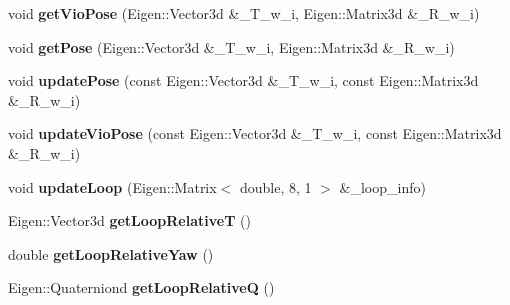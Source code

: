 \begin{DoxyCompactItemize}
\item 
\mbox{\label{classKeyFrame_ac52e119d0490ba6bff36531032bd3840}} 
void {\bfseries get\+Vio\+Pose} (Eigen\+::\+Vector3d \&\+\_\+\+T\+\_\+w\+\_\+i, Eigen\+::\+Matrix3d \&\+\_\+\+R\+\_\+w\+\_\+i)
\item 
\mbox{\label{classKeyFrame_a24f40f8b54c3b1be6b5bde3e8f6b682f}} 
void {\bfseries get\+Pose} (Eigen\+::\+Vector3d \&\+\_\+\+T\+\_\+w\+\_\+i, Eigen\+::\+Matrix3d \&\+\_\+\+R\+\_\+w\+\_\+i)
\item 
\mbox{\label{classKeyFrame_a553565034bc1933f122352a90a552c98}} 
void {\bfseries update\+Pose} (const Eigen\+::\+Vector3d \&\+\_\+\+T\+\_\+w\+\_\+i, const Eigen\+::\+Matrix3d \&\+\_\+\+R\+\_\+w\+\_\+i)
\item 
\mbox{\label{classKeyFrame_a5947ef3d15931e4b9c426f0f2bd28821}} 
void {\bfseries update\+Vio\+Pose} (const Eigen\+::\+Vector3d \&\+\_\+\+T\+\_\+w\+\_\+i, const Eigen\+::\+Matrix3d \&\+\_\+\+R\+\_\+w\+\_\+i)
\item 
\mbox{\label{classKeyFrame_a3a0626bee71655eb94061eb738a49054}} 
void {\bfseries update\+Loop} (Eigen\+::\+Matrix$<$ double, 8, 1 $>$ \&\+\_\+loop\+\_\+info)
\item 
\mbox{\label{classKeyFrame_a83ec888526786fe846f9c464b4998af2}} 
Eigen\+::\+Vector3d {\bfseries get\+Loop\+RelativeT} ()
\item 
\mbox{\label{classKeyFrame_a3bb8e41d6333c43251d9347f054665f1}} 
double {\bfseries get\+Loop\+Relative\+Yaw} ()
\item 
\mbox{\label{classKeyFrame_a2dd650aed62f98f8e296b43365a89047}} 
Eigen\+::\+Quaterniond {\bfseries get\+Loop\+RelativeQ} ()
\end{DoxyCompactItemize}
